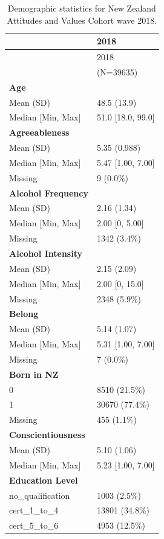 \documentclass[
  single column]{article}
\begin{document}
\begin{longtable}[]{@{}ll@{}}
\caption{Demographic statistics for New Zealand Attitudes and Values
Cohort wave 2018.}\label{tbl-appendix-baseline}\tabularnewline
\toprule\noalign{}
& 2018 \\
\midrule\noalign{}
\endfirsthead
\toprule\noalign{}
& 2018 \\
\midrule\noalign{}
\endhead
\bottomrule\noalign{}
\endlastfoot
& (N=39635) \\
\textbf{Age} & \\
Mean (SD) & 48.5 (13.9) \\
Median {[}Min, Max{]} & 51.0 {[}18.0, 99.0{]} \\
\textbf{Agreeableness} & \\
Mean (SD) & 5.35 (0.988) \\
Median {[}Min, Max{]} & 5.47 {[}1.00, 7.00{]} \\
Missing & 9 (0.0\%) \\
\textbf{Alcohol Frequency} & \\
Mean (SD) & 2.16 (1.34) \\
Median {[}Min, Max{]} & 2.00 {[}0, 5.00{]} \\
Missing & 1342 (3.4\%) \\
\textbf{Alcohol Intensity} & \\
Mean (SD) & 2.15 (2.09) \\
Median {[}Min, Max{]} & 2.00 {[}0, 15.0{]} \\
Missing & 2348 (5.9\%) \\
\textbf{Belong} & \\
Mean (SD) & 5.14 (1.07) \\
Median {[}Min, Max{]} & 5.31 {[}1.00, 7.00{]} \\
Missing & 7 (0.0\%) \\
\textbf{Born in NZ} & \\
0 & 8510 (21.5\%) \\
1 & 30670 (77.4\%) \\
Missing & 455 (1.1\%) \\
\textbf{Conscientiousness} & \\
Mean (SD) & 5.10 (1.06) \\
Median {[}Min, Max{]} & 5.23 {[}1.00, 7.00{]} \\
\textbf{Education Level} & \\
no\_qualification & 1003 (2.5\%) \\
cert\_1\_to\_4 & 13801 (34.8\%) \\
cert\_5\_to\_6 & 4953 (12.5\%) \\

\end{longtable}
\end{document}
